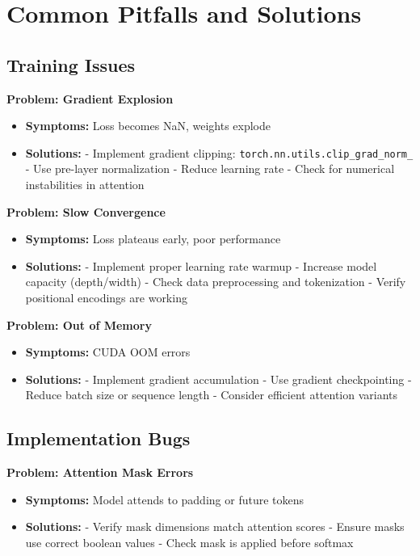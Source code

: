 \documentclass[11pt]{article}
\begin{document}
\section{Common Pitfalls and Solutions}

\subsection{Training Issues}

\textbf{Problem: Gradient Explosion}
\begin{itemize}
    \item \textbf{Symptoms:} Loss becomes NaN, weights explode
    \item \textbf{Solutions:} 
        - Implement gradient clipping: \texttt{torch.nn.utils.clip\_grad\_norm\_}
        - Use pre-layer normalization
        - Reduce learning rate
        - Check for numerical instabilities in attention
\end{itemize}

\textbf{Problem: Slow Convergence}
\begin{itemize}
    \item \textbf{Symptoms:} Loss plateaus early, poor performance
    \item \textbf{Solutions:}
        - Implement proper learning rate warmup
        - Increase model capacity (depth/width)
        - Check data preprocessing and tokenization
        - Verify positional encodings are working
\end{itemize}

\textbf{Problem: Out of Memory}
\begin{itemize}
    \item \textbf{Symptoms:} CUDA OOM errors
    \item \textbf{Solutions:}
        - Implement gradient accumulation
        - Use gradient checkpointing
        - Reduce batch size or sequence length
        - Consider efficient attention variants
\end{itemize}

\subsection{Implementation Bugs}

\textbf{Problem: Attention Mask Errors}
\begin{itemize}
    \item \textbf{Symptoms:} Model attends to padding or future tokens
    \item \textbf{Solutions:}
        - Verify mask dimensions match attention scores
        - Ensure masks use correct boolean values
        - Check mask is applied before softmax
\end{itemize}
\end{document}
